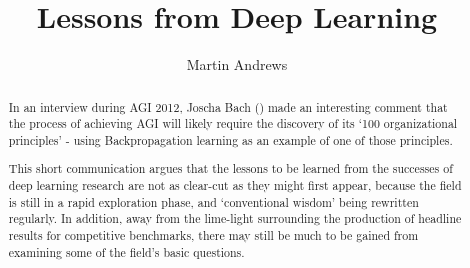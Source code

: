 \documentclass[citeauthoryear]{llncs}
\begin{document}
%
\frontmatter          %
%
\pagestyle{headings}  %
%
\mainmatter              %
%
\title{Lessons from Deep Learning}
%
%
\author{Martin Andrews}
%
%
%

\maketitle              %

\begin{abstract}



In an interview  during AGI 2012, Joscha Bach (\cite{Joscha-Bach-2012-interview}) 
made an interesting comment that the process of achieving 
AGI will likely require the discovery of its `100 organizational principles' - 
using Backpropagation learning as an example of one of those principles.  

This short communication argues that the lessons to be learned from 
the successes of deep learning research are not as clear-cut as they might first appear,
because the field is still in a rapid exploration phase, and `conventional wisdom' 
being rewritten regularly.   In addition, away from the lime-light surrounding 
the production of headline results for competitive benchmarks, 
there may still be much to be gained from examining some of 
the field's basic questions.

\end{abstract}
%
\end{document}
